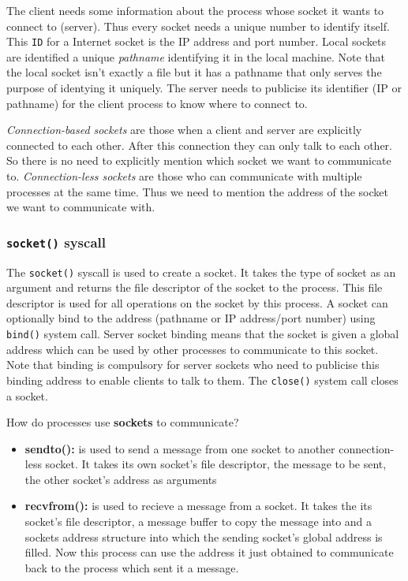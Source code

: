 \documentclass[12pt]{article}
\begin{document}
The client needs some information about the process whose socket it wants to connect to (server). Thus every socket needs a unique number
to identify itself. This \texttt{ID} for a Internet socket is the IP address and port number. Local sockets are identified a unique \textit{pathname} identifying it in the local machine. Note that the local
socket isn't exactly a file but it has a pathname that only serves the purpose of identying it uniquely.
The server needs to publicise its identifier (IP or pathname) for the client process to know where to connect to.


\textit{Connection-based sockets} are those when a client and server are explicitly connected to each other. After this connection they can only talk to each other. So there is no need to explicitly mention which socket we want to communicate to.
\textit{Connection-less sockets} are those who can communicate with multiple processes at the same time. Thus we need to mention the address of the socket we want to communicate with. 


\subsubsection{\texttt{socket()} syscall}
The \texttt{socket()} syscall is used to create a socket. It takes the type of socket as an argument and returns the file descriptor of the socket to the process. This file descriptor 
is used for all operations on the socket by this process. A socket can optionally bind to the address (pathname or IP address/port number) using \texttt{bind()} system call. 
Server socket binding means that the socket is given a global address which can be used by other processes to communicate to this socket. Note that binding is compulsory for server sockets who need to 
publicise this binding address to enable clients to talk to them. The \texttt{close()} system call closes a socket.


How do processes use \textbf{sockets} to communicate?
\begin{itemize}[topsep=0pt, partopsep=0pt, itemsep=0pt, parsep=0pt]
    \item \textbf{sendto():} is used to send a message from one socket to another connection-less socket. It takes its own socket's file descriptor, the message to be sent, the other socket's address as arguments
    \item \textbf{recvfrom():} is used to recieve a message from a socket. It takes the its socket's file descriptor, a message buffer to copy the message into and a sockets address structure into which the sending socket's
    global address is filled. Now this process can use the address it just obtained to communicate back to the process which sent it a message. 
\end{itemize}
\end{document}
